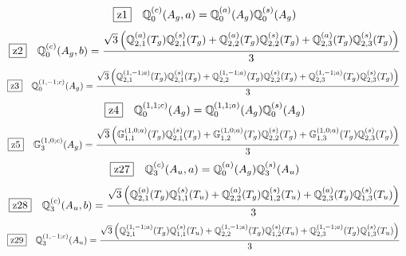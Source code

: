 \documentclass[fleqn,10pt,landscape]{jsarticle}
\begin{document}
\begin{dmath*}
\hspace*{3mm}\fbox{z1}\quad \mathbb{Q}_{0}^{(c)}(A_{g},a)=\mathbb{Q}_{0}^{(a)}(A_{g}) \mathbb{Q}_{0}^{(s)}(A_{g})
\end{dmath*}
\begin{dmath*}
\hspace*{3mm}\fbox{z2}\quad \mathbb{Q}_{0}^{(c)}(A_{g},b)=\frac{\sqrt{3} \left(\mathbb{Q}_{2,1}^{(a)}(T_{g}) \mathbb{Q}_{2,1}^{(s)}(T_{g}) + \mathbb{Q}_{2,2}^{(a)}(T_{g}) \mathbb{Q}_{2,2}^{(s)}(T_{g}) + \mathbb{Q}_{2,3}^{(a)}(T_{g}) \mathbb{Q}_{2,3}^{(s)}(T_{g})\right)}{3}
\end{dmath*}
\begin{dmath*}
\hspace*{3mm}\fbox{z3}\quad \mathbb{Q}_{0}^{(1,-1;c)}(A_{g})=\frac{\sqrt{3} \left(\mathbb{Q}_{2,1}^{(1,-1;a)}(T_{g}) \mathbb{Q}_{2,1}^{(s)}(T_{g}) + \mathbb{Q}_{2,2}^{(1,-1;a)}(T_{g}) \mathbb{Q}_{2,2}^{(s)}(T_{g}) + \mathbb{Q}_{2,3}^{(1,-1;a)}(T_{g}) \mathbb{Q}_{2,3}^{(s)}(T_{g})\right)}{3}
\end{dmath*}
\begin{dmath*}
\hspace*{3mm}\fbox{z4}\quad \mathbb{Q}_{0}^{(1,1;c)}(A_{g})=\mathbb{Q}_{0}^{(1,1;a)}(A_{g}) \mathbb{Q}_{0}^{(s)}(A_{g})
\end{dmath*}
\begin{dmath*}
\hspace*{3mm}\fbox{z5}\quad \mathbb{G}_{3}^{(1,0;c)}(A_{g})=\frac{\sqrt{3} \left(\mathbb{G}_{1,1}^{(1,0;a)}(T_{g}) \mathbb{Q}_{2,1}^{(s)}(T_{g}) + \mathbb{G}_{1,2}^{(1,0;a)}(T_{g}) \mathbb{Q}_{2,2}^{(s)}(T_{g}) + \mathbb{G}_{1,3}^{(1,0;a)}(T_{g}) \mathbb{Q}_{2,3}^{(s)}(T_{g})\right)}{3}
\end{dmath*}
\begin{dmath*}
\hspace*{3mm}\fbox{z27}\quad \mathbb{Q}_{3}^{(c)}(A_{u},a)=\mathbb{Q}_{0}^{(a)}(A_{g}) \mathbb{Q}_{3}^{(s)}(A_{u})
\end{dmath*}
\begin{dmath*}
\hspace*{3mm}\fbox{z28}\quad \mathbb{Q}_{3}^{(c)}(A_{u},b)=\frac{\sqrt{3} \left(\mathbb{Q}_{2,1}^{(a)}(T_{g}) \mathbb{Q}_{1,1}^{(s)}(T_{u}) + \mathbb{Q}_{2,2}^{(a)}(T_{g}) \mathbb{Q}_{1,2}^{(s)}(T_{u}) + \mathbb{Q}_{2,3}^{(a)}(T_{g}) \mathbb{Q}_{1,3}^{(s)}(T_{u})\right)}{3}
\end{dmath*}
\begin{dmath*}
\hspace*{3mm}\fbox{z29}\quad \mathbb{Q}_{3}^{(1,-1;c)}(A_{u})=\frac{\sqrt{3} \left(\mathbb{Q}_{2,1}^{(1,-1;a)}(T_{g}) \mathbb{Q}_{1,1}^{(s)}(T_{u}) + \mathbb{Q}_{2,2}^{(1,-1;a)}(T_{g}) \mathbb{Q}_{1,2}^{(s)}(T_{u}) + \mathbb{Q}_{2,3}^{(1,-1;a)}(T_{g}) \mathbb{Q}_{1,3}^{(s)}(T_{u})\right)}{3}
\end{dmath*}
\end{document}
